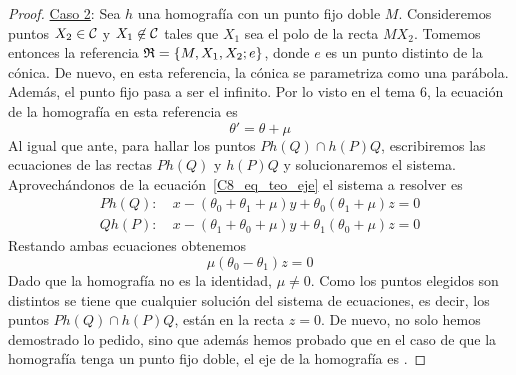 \begin{proof}
	\underline{Caso 2}: Sea $h$ una homografía con un punto fijo doble $M$. Consideremos puntos $X_2\in\mathcal{C}$ y $X_1\not\in\mathcal{C}$ tales que $X_1$ sea el polo de la recta $MX_2$. Tomemos entonces la referencia $\mathfrak{R}=\{M,X_1,X_2;e\}$, donde $e$ es un punto distinto de la cónica. De nuevo, en esta referencia, la cónica se parametriza como una parábola. Además, el punto fijo pasa a ser el infinito. Por lo visto en el tema $6$, la ecuación de la homografía en esta referencia es
	\[\theta'=\theta+\mu\]
	Al igual que ante, para hallar los puntos $Ph(Q)\cap h(P)Q$, escribiremos las ecuaciones de las rectas $Ph(Q)$ y $h(P)Q$ y solucionaremos el sistema. Aprovechándonos de la ecuación~\ref{C8_eq_teo_eje} el sistema a resolver es
	\begin{equation*}
		\begin{split}
			Ph(Q):& \ x-(\theta_0+\theta_1+\mu)y+\theta_0(\theta_1+\mu)z=0\\
			Qh(P):& \ x-(\theta_1+\theta_0+\mu)y+\theta_1(\theta_0+\mu)z=0
		\end{split}
	\end{equation*}
	Restando ambas ecuaciones obtenemos
	\[\mu(\theta_0-\theta_1)z=0\]
	Dado que la homografía no es la identidad, $\mu\not=0$. Como los puntos elegidos son distintos se tiene que cualquier solución del sistema de ecuaciones, es decir, los puntos $Ph(Q)\cap h(P)Q$, están en la recta $z=0$. De nuevo, no solo hemos demostrado lo pedido, sino que además hemos probado que en el caso de que la homografía tenga un punto fijo doble, el eje de la homografía es .
\end{proof}
